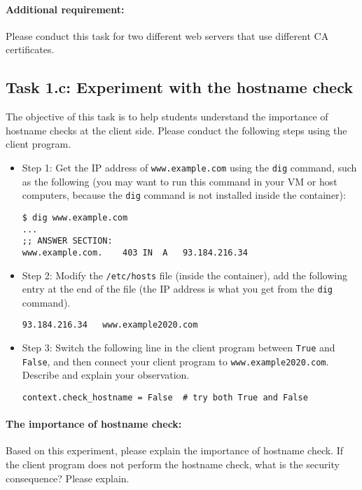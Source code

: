 \paragraph{Additional requirement:} Please conduct this task for two different web servers
that use different CA certificates.


\subsection{Task 1.c: Experiment with the hostname check}

The objective of this task is to help students understand the importance of 
hostname checks at the client side. Please conduct the following 
steps using the client program. 


\begin{itemize}
\item Step 1: Get the IP address of \texttt{www.example.com} using 
the \texttt{dig} command, such as the following (you may want to run
this command in your VM or host computers, because the \texttt{dig}
command is not installed inside the container): 


\begin{lstlisting}
$ dig www.example.com
...
;; ANSWER SECTION:
www.example.com.	403	IN	A	93.184.216.34
\end{lstlisting}

\item Step 2: Modify the \texttt{/etc/hosts} file (inside the 
container), add the following 
entry at the end of the file (the IP address is what you get from
the \texttt{dig} command). 

\begin{lstlisting}
93.184.216.34   www.example2020.com
\end{lstlisting}


\item Step 3: Switch the following line in the client program
between \texttt{True} and \texttt{False}, and then 
connect your client program to \texttt{www.example2020.com}. 
Describe and explain your observation. 

\begin{lstlisting}
context.check_hostname = False  # try both True and False
\end{lstlisting}
\end{itemize}


\paragraph{The importance of hostname check:}
Based on this experiment, please explain the importance of hostname check.
If the client program does not perform the hostname check, what 
is the security consequence? Please explain.


